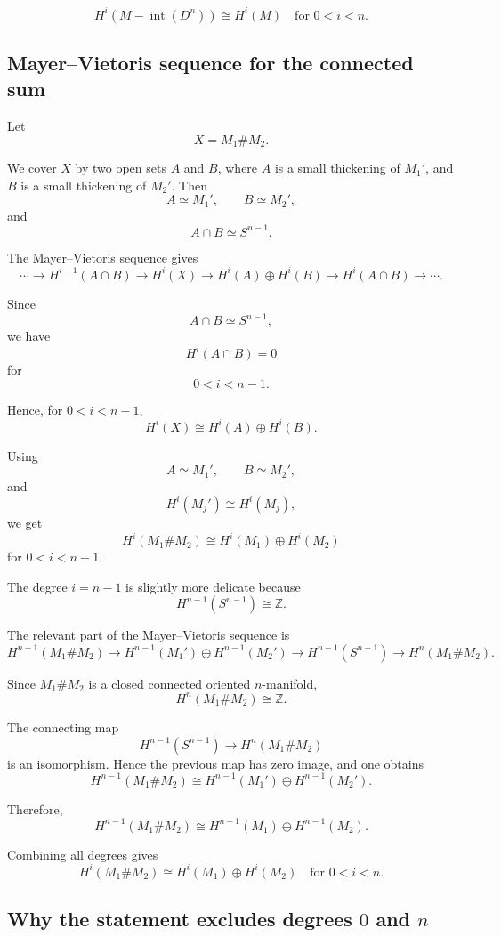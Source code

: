 \documentclass[12pt,a4paper]{article}
\theoremstyle{notespace}
\begin{document}
\[
\boxed{
	H^i(M-\operatorname{int}(D^n))
	\cong
	H^i(M)
	\quad\text{for }0<i<n.
}
\]

\subsection{Mayer--Vietoris sequence for the connected sum}

Let
\[
X=M_1\#M_2.
\]

We cover \(X\) by two open sets \(A\) and \(B\), where \(A\) is a small
thickening of \(M_1'\), and \(B\) is a small thickening of \(M_2'\). Then
\[
A\simeq M_1',
\qquad
B\simeq M_2',
\]
and
\[
A\cap B\simeq S^{n-1}.
\]

The Mayer--Vietoris sequence gives
\[
\cdots
\longrightarrow
H^{i-1}(A\cap B)
\longrightarrow
H^i(X)
\longrightarrow
H^i(A)\oplus H^i(B)
\longrightarrow
H^i(A\cap B)
\longrightarrow
\cdots .
\]

Since
\[
A\cap B\simeq S^{n-1},
\]
we have
\[
H^i(A\cap B)=0
\]
for
\[
0<i<n-1.
\]

Hence, for \(0<i<n-1\),
\[
H^i(X)
\cong
H^i(A)\oplus H^i(B).
\]

Using
\[
A\simeq M_1',
\qquad
B\simeq M_2',
\]
and
\[
H^i(M_j')\cong H^i(M_j),
\]
we get
\[
H^i(M_1\#M_2)
\cong
H^i(M_1)\oplus H^i(M_2)
\]
for \(0<i<n-1\).

The degree \(i=n-1\) is slightly more delicate because
\[
H^{n-1}(S^{n-1})\cong \mathbb{Z}.
\]

The relevant part of the Mayer--Vietoris sequence is
\[
H^{n-1}(M_1\#M_2)
\longrightarrow
H^{n-1}(M_1')\oplus H^{n-1}(M_2')
\longrightarrow
H^{n-1}(S^{n-1})
\longrightarrow
H^n(M_1\#M_2).
\]

Since \(M_1\#M_2\) is a closed connected oriented \(n\)-manifold,
\[
H^n(M_1\#M_2)\cong \mathbb{Z}.
\]

The connecting map
\[
H^{n-1}(S^{n-1})
\longrightarrow
H^n(M_1\#M_2)
\]
is an isomorphism. Hence the previous map has zero image, and one obtains
\[
H^{n-1}(M_1\#M_2)
\cong
H^{n-1}(M_1')\oplus H^{n-1}(M_2').
\]

Therefore,
\[
H^{n-1}(M_1\#M_2)
\cong
H^{n-1}(M_1)\oplus H^{n-1}(M_2).
\]

Combining all degrees gives
\[
\boxed{
	H^i(M_1\#M_2)
	\cong
	H^i(M_1)\oplus H^i(M_2)
	\quad
	\text{for }0<i<n.
}
\]

\subsection{Why the statement excludes degrees \(0\) and \(n\)}
\end{document}
